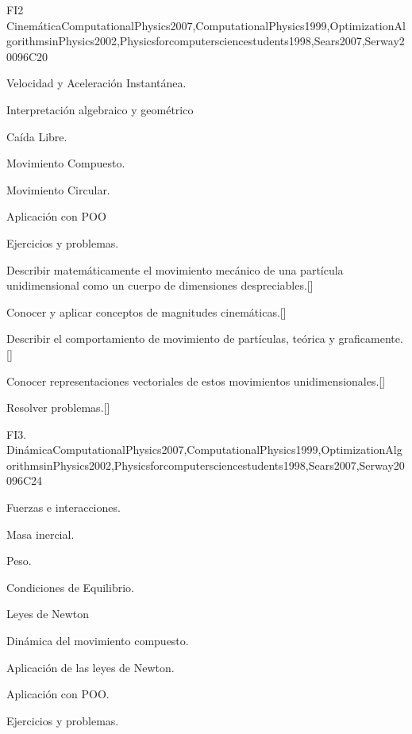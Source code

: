 \begin{syllabus}
\begin{unit}{}{FI2 Cinemática}{ComputationalPhysics2007,ComputationalPhysics1999,OptimizationAlgorithmsinPhysics2002,Physicsforcomputersciencestudents1998,Sears2007,Serway2009}{6}{C20}
\begin{topics}
      \item Velocidad y Aceleración Instantánea.
      \item Interpretación algebraico y geométrico
      \item Caída Libre.
      \item Movimiento Compuesto.
      \item Movimiento Circular.
      \item Aplicación con POO
      \item Ejercicios y problemas.
    \end{topics}
   \begin{learningoutcomes}
      \item Describir matemáticamente el movimiento mecánico de una partícula unidimensional como un cuerpo de dimensiones despreciables.[\Usage]
      \item Conocer y aplicar conceptos de magnitudes cinemáticas.[\Usage]
      \item Describir el comportamiento de movimiento de partículas, teórica y graficamente.[\Usage]
      \item Conocer representaciones vectoriales de estos movimientos unidimensionales.[\Usage]
      \item Resolver problemas.[\Usage]
   \end{learningoutcomes}
\end{unit}

\begin{unit}{}{FI3. Dinámica}{ComputationalPhysics2007,ComputationalPhysics1999,OptimizationAlgorithmsinPhysics2002,Physicsforcomputersciencestudents1998,Sears2007,Serway2009}{6}{C24}
\begin{topics}
      \item Fuerzas e interacciones.
      \item Masa inercial.
      \item Peso.
      \item Condiciones de Equilibrio.
      \item Leyes de Newton
      \item Dinámica del movimiento compuesto.
      \item Aplicación de las leyes de Newton.
      \item Aplicación con POO.
      \item Ejercicios y problemas.
   \end{topics}


\end{unit}
\end{syllabus}
